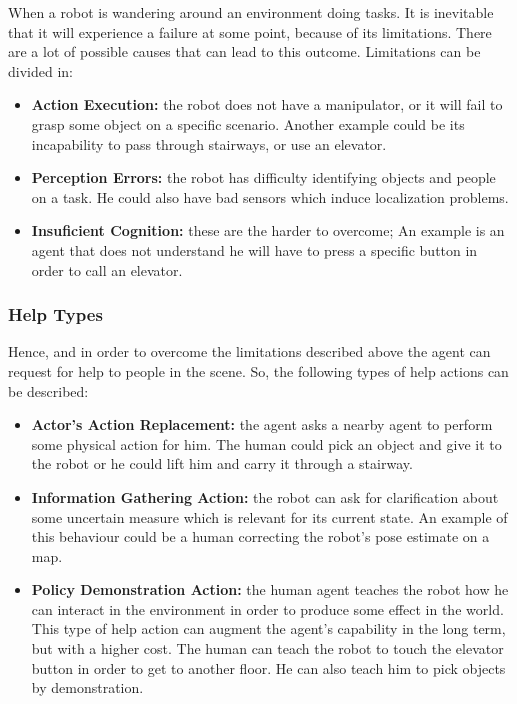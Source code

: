When a robot is wandering around an environment doing tasks. It is inevitable
that it will experience a failure at some point, because of its limitations.
There are a lot of possible causes that can lead to this outcome. Limitations
can be divided in:
\begin{itemize}
    \item \textbf{Action Execution:} the robot does not have a manipulator, or
    it will fail to grasp some object on a specific scenario. Another example
    could be its incapability to pass through stairways, or use an elevator.
    \item \textbf{Perception Errors:} the robot has difficulty identifying
    objects and people on a task. He could also have bad sensors which induce
    localization problems.
    \item \textbf{Insuficient Cognition:} these are the harder to overcome;
    An example is an agent that does not understand he will have to press a
    specific button in order to call an elevator.
\end{itemize}

\subsubsection{Help Types}
\label{sec:help_types}

Hence, and in order to overcome the limitations described above the agent can
request for help to people in the scene. So, the following types of help actions
can be described:
\begin{itemize}
  \item \textbf{Actor's Action Replacement:} the agent asks a nearby agent to
  perform some physical action for him. The human could pick an object and give
  it to the robot or he could lift him and carry it through a stairway.
  \item \textbf{Information Gathering Action:} the robot can ask for clarification
  about some uncertain measure which is relevant for its current state. An example
  of this behaviour could be a human correcting the robot's pose estimate on a map.
  \item \textbf{Policy Demonstration Action:} the human agent teaches the robot
  how he can interact in the environment in order to produce some effect in the
  world. This type of help action can augment the agent's capability in the long
  term, but with a higher cost. The human can teach the robot to touch the elevator
  button in order to get to another floor. He can also teach him to pick objects
  by demonstration.
\end{itemize}

